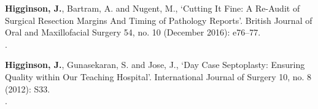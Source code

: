 \vspace{0.1cm}

 \textbf{Higginson, J.}, Bartram, A. and Nugent, M., `Cutting It Fine: A Re-Audit of Surgical Resection Margins And Timing of Pathology Reports’. British Journal of Oral and Maxillofacial Surgery 54, no. 10 (December 2016): e76–77. 
\\.

\vspace{0.1cm}

 \textbf{Higginson, J.}, Gunasekaran, S. and Jose, J., `Day Case Septoplasty: Ensuring Quality within Our Teaching Hospital’. International Journal of Surgery 10, no. 8 (2012): S33. 
\\.




